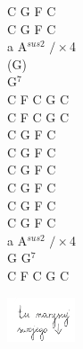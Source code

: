 \documentclass[a5paper, 10pt]{book}
\begin{document}
\begin{minipage}[t]{0.2\textwidth}
C G F C\\
C G F C\\

a A$^{sus2}$ $/ \times$4\\
(G)\\
G$^7$\\

C F C G C\\
C F C G C\\

C G F C\\
C G F C\\

C G F C\\
C G F C\\

C G F C\\
C G F C\\

a A$^{sus2}$ $/ \times$4\\
G G$^7$\\

C F C G C\\
\end{minipage}
\includegraphics[width=0.15\textwidth, center]{images/pila.png}\\

\newpage
\end{document}
